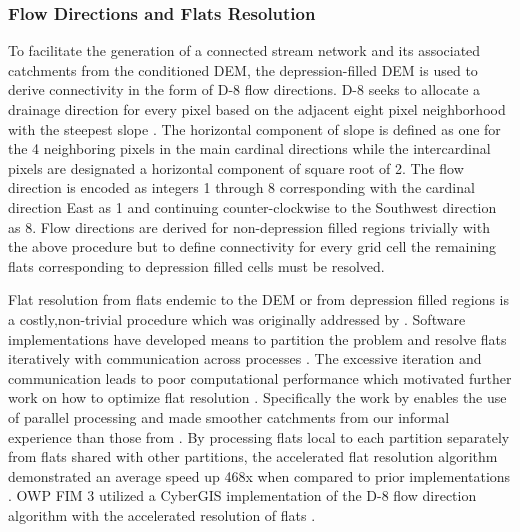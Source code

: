 \subsubsection{Flow Directions and Flats Resolution}
\label{ssec:flow_direction_and_flat_resolution}
%
To facilitate the generation of a connected stream network and its associated catchments from the conditioned DEM, the depression-filled DEM is used to derive connectivity in the form of D-8 flow directions.
D-8 seeks to allocate a drainage direction for every pixel based on the adjacent eight pixel neighborhood with the steepest slope \cite{o1984extraction}.
The horizontal component of slope is defined as one for the 4 neighboring pixels in the main cardinal directions while the intercardinal pixels are designated a horizontal component of square root of 2. 
The flow direction is encoded as integers 1 through 8 corresponding with the cardinal direction East as 1 and continuing counter-clockwise to the Southwest direction as 8. 
Flow directions are derived for non-depression filled regions trivially with the above procedure but to define connectivity for every grid cell the remaining flats corresponding to depression filled cells must be resolved.

Flat resolution from flats endemic to the DEM or from depression filled regions is a costly,non-trivial procedure which was originally addressed by .  
Software implementations have developed means to partition the problem and resolve flats iteratively with communication across processes \cite{tarboton2009generalized,tesfa2011extraction,wallis2009parallel,tarboton2005terrain}.
The excessive iteration and communication leads to poor computational performance which motivated further work on how to optimize flat resolution \cite{survila2016scalable,barnes2014efficient}.
Specifically the work by  enables the use of parallel processing and made smoother catchments from our informal experience than those from .
By processing flats local to each partition separately from flats shared with other partitions, the accelerated flat resolution algorithm demonstrated an average speed up 468x when compared to prior implementations \cite{survila2016scalable}.
OWP FIM 3 utilized a CyberGIS implementation of the D-8 flow direction algorithm with the accelerated resolution of flats \cite{survila2016scalable,cybergis2016}.
%
